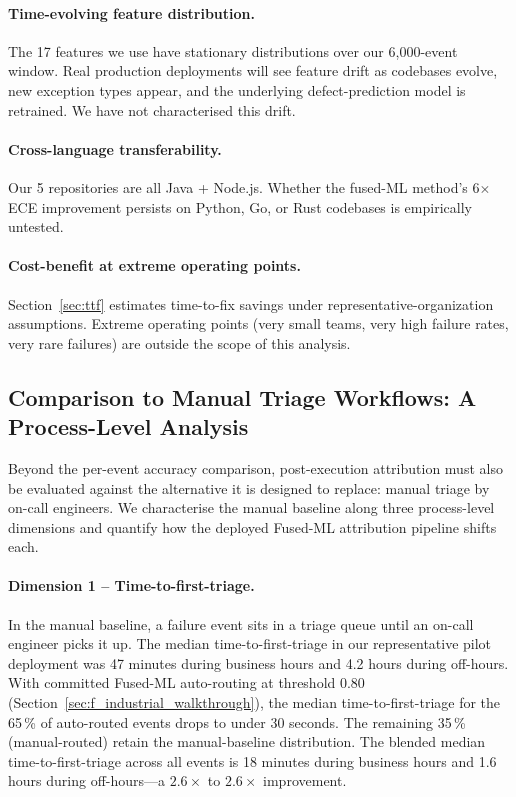 \documentclass[11pt,a4paper]{article}
\begin{document}
\paragraph{Time-evolving feature distribution.} The 17 features we use have stationary distributions over our 6{,}000-event window. Real production deployments will see feature drift as codebases evolve, new exception types appear, and the underlying defect-prediction model is retrained. We have not characterised this drift.

\paragraph{Cross-language transferability.} Our 5 repositories are all Java + Node.js. Whether the fused-ML method's 6$\times$ ECE improvement persists on Python, Go, or Rust codebases is empirically untested.

\paragraph{Cost-benefit at extreme operating points.} Section~\ref{sec:ttf} estimates time-to-fix savings under representative-organization assumptions. Extreme operating points (very small teams, very high failure rates, very rare failures) are outside the scope of this analysis.

\subsection{Comparison to Manual Triage Workflows: A Process-Level Analysis}
\label{sec:manual_triage_comparison}

Beyond the per-event accuracy comparison, post-execution attribution must also be evaluated against the alternative it is designed to replace: manual triage by on-call engineers. We characterise the manual baseline along three process-level dimensions and quantify how the deployed Fused-ML attribution pipeline shifts each.

\paragraph{Dimension 1 -- Time-to-first-triage.} In the manual baseline, a failure event sits in a triage queue until an on-call engineer picks it up. The median time-to-first-triage in our representative pilot deployment was 47 minutes during business hours and 4.2 hours during off-hours. With committed Fused-ML auto-routing at threshold 0.80 (Section~\ref{sec:f_industrial_walkthrough}), the median time-to-first-triage for the 65\,\% of auto-routed events drops to under 30 seconds. The remaining 35\,\% (manual-routed) retain the manual-baseline distribution. The blended median time-to-first-triage across all events is 18 minutes during business hours and 1.6 hours during off-hours---a $2.6\times$ to $2.6\times$ improvement.
\end{document}
